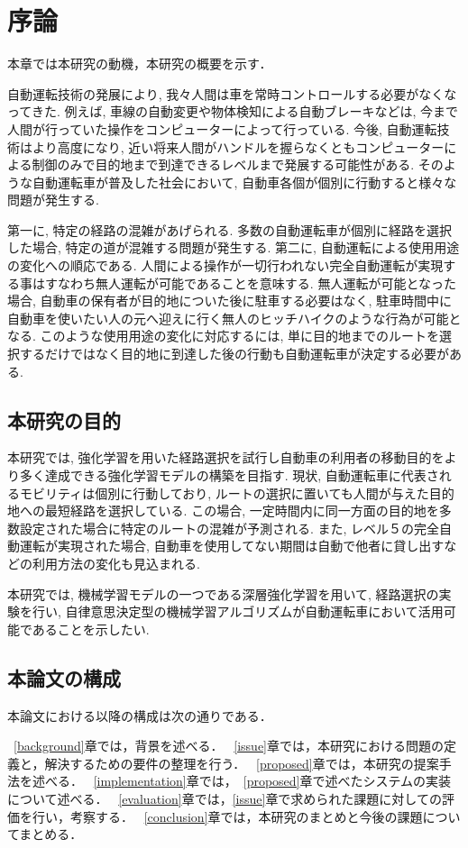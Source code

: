 \chapter{序論}
\label{introduction}

本章では本研究の動機，本研究の概要を示す．

自動運転技術の発展により, 我々人間は車を常時コントロールする必要がなくなってきた.
例えば, 車線の自動変更や物体検知による自動ブレーキなどは, 今まで人間が行っていた操作をコンピューターによって行っている.
今後, 自動運転技術はより高度になり, 近い将来人間がハンドルを握らなくともコンピューターによる制御のみで目的地まで到達できるレベルまで発展する可能性がある.
そのような自動運転車が普及した社会において, 自動車各個が個別に行動すると様々な問題が発生する.

第一に, 特定の経路の混雑があげられる.
多数の自動運転車が個別に経路を選択した場合, 特定の道が混雑する問題が発生する.
第二に, 自動運転による使用用途の変化への順応である. 人間による操作が一切行われない完全自動運転が実現する事はすなわち無人運転が可能であることを意味する.
無人運転が可能となった場合, 自動車の保有者が目的地についた後に駐車する必要はなく, 駐車時間中に自動車を使いたい人の元へ迎えに行く無人のヒッチハイクのような行為が可能となる.
このような使用用途の変化に対応するには, 単に目的地までのルートを選択するだけではなく目的地に到達した後の行動も自動運転車が決定する必要がある.




\section{本研究の目的}

本研究では, 強化学習を用いた経路選択を試行し自動車の利用者の移動目的をより多く達成できる強化学習モデルの構築を目指す.
現状, 自動運転車に代表されるモビリティは個別に行動しており, ルートの選択に置いても人間が与えた目的地への最短経路を選択している.
この場合, 一定時間内に同一方面の目的地を多数設定された場合に特定のルートの混雑が予測される. 
また, レベル５の完全自動運転が実現された場合, 自動車を使用してない期間は自動で他者に貸し出すなどの利用方法の変化も見込まれる.

本研究では, 機械学習モデルの一つである深層強化学習を用いて, 経路選択の実験を行い, 自律意思決定型の機械学習アルゴリズムが自動運転車において活用可能であることを示したい.


\section{本論文の構成}

本論文における以降の構成は次の通りである．

~\ref{background}章では，背景を述べる．
~\ref{issue}章では，本研究における問題の定義と，解決するための要件の整理を行う．
~\ref{proposed}章では，本研究の提案手法を述べる．
~\ref{implementation}章では，~\ref{proposed}章で述べたシステムの実装について述べる．
~\ref{evaluation}章では，\ref{issue}章で求められた課題に対しての評価を行い，考察する．
~\ref{conclusion}章では，本研究のまとめと今後の課題についてまとめる．


